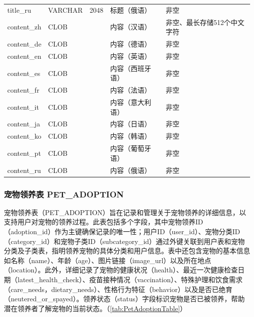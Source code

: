 \begin{longtable}[c]{@{}llrll@{}}
    title\_ru       & VARCHAR       & 2048        & 标题（俄语）      & 非空                                         \\
    content\_zh     & CLOB          &             & 内容（汉语）      & 非空、最长存储512个中文字符                            \\
    content\_de     & CLOB          &             & 内容（德语）      & 非空                                         \\
    content\_en     & CLOB          &             & 内容（英语）      & 非空                                         \\
    content\_es     & CLOB          &             & 内容（西班牙语）    & 非空                                         \\
    content\_fr     & CLOB          &             & 内容（法语）      & 非空                                         \\
    content\_it     & CLOB          &             & 内容（意大利语）    & 非空                                         \\
    content\_ja     & CLOB          &             & 内容（日语）      & 非空                                         \\
    content\_ko     & CLOB          &             & 内容（韩语）      & 非空                                         \\
    content\_pt     & CLOB          &             & 内容（葡萄牙语）    & 非空                                         \\
    content\_ru     & CLOB          &             & 内容（俄语）      & 非空                                         \\ \bottomrule
\end{longtable}

\subsubsection{宠物领养表 PET\_ADOPTION}

宠物领养表（PET\_ADOPTION）旨在记录和管理关于宠物领养的详细信息，以支持用户对宠物的领养过程。此表包括多个字段，其中宠物领养ID（adoption\_id）作为主键确保记录的唯一性；用户ID（user\_id）、宠物分类ID（category\_id）和宠物子类ID（subcategory\_id）通过外键关联到用户表和宠物分类及子类表，指明领养宠物的具体分类和用户信息。表中还包含宠物的基本信息如名称（name）、年龄（age）、图片链接（image\_url）以及所在地点（location）。此外，详细记录了宠物的健康状况（health）、最近一次健康检查日期（latest\_health\_check）、疫苗接种情况（vaccination）、特殊护理和饮食需求（care\_needs，dietary\_needs）、性格行为特征（behavior）以及是否已绝育（neutered\_or\_spayed）。领养状态（status）字段标识宠物是否已被领养，帮助潜在领养者了解宠物的当前状态。（\cref{tab:PetAdoptionTable}）

